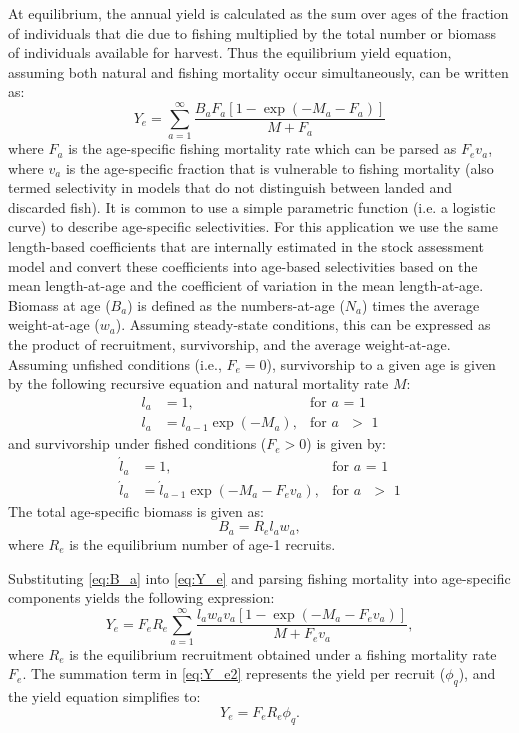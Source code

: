 \documentclass[12pt,leqno]{article}
\begin{document}
At equilibrium, the annual yield is calculated as the sum over ages of the fraction of individuals that die due to fishing multiplied by the total number or biomass of individuals available for harvest.  Thus the equilibrium yield equation, assuming both natural and fishing mortality occur simultaneously,  can be written as:
\begin{equation}\label{eq:Y_e}
	Y_e = \sum_{a=1}^\infty \frac{B_a F_a [1-\exp(-M_a-F_a)]}{M+F_a}
\end{equation}
where $F_a$ is the age-specific fishing mortality rate which can be parsed as $F_e v_a$, where $v_a$ is the age-specific fraction that is vulnerable to fishing mortality (also termed selectivity in models that do not distinguish between landed and discarded fish).  It is common to use a simple parametric function (i.e. a logistic curve) to describe age-specific selectivities.  For this application we use the same length-based coefficients that are internally estimated in the stock assessment model and convert these coefficients into age-based selectivities based on the mean length-at-age and the coefficient of variation in the mean length-at-age.  Biomass at age ($B_a$) is defined as the numbers-at-age ($N_a$) times the average weight-at-age ($w_a$).  Assuming steady-state conditions, this can be expressed as the product of recruitment, survivorship, and the average weight-at-age.  Assuming unfished conditions (i.e., $F_e=0$), survivorship to a given age is given by the following recursive equation and natural mortality rate $M$:
\begin{align}\label{eq:unfished_survivorship}
	l_a &= 1,  &\mbox{for $a$ = 1} \nonumber \\
	l_a &= l_{a-1} \exp(-M_a),& \mbox{for $a$ $>$ 1}
\end{align}
and survivorship under fished conditions ($F_e > 0$) is given by:
\begin{align}\label{eq:fished_survivorship}
	\acute{l}_a &=1, &\mbox{for $a$ = 1} \nonumber\\
	\acute{l}_{a} &= \acute{l}_{a-1} \exp(-M_a-F_e v_a), &\mbox{for $a$ $>$ 1} 
\end{align}
The total age-specific biomass  is given as:
\begin{equation} \label{eq:B_a}
	B_a = R_e l_a w_a,
\end{equation}
where $R_e$ is the equilibrium number of age-1 recruits.

Substituting \eqref{eq:B_a} into  \eqref{eq:Y_e} and parsing fishing mortality into age-specific components yields the following expression:
\begin{equation}\label{eq:Y_e2}
	Y_e = F_e R_e \sum_{a=1}^\infty \frac{l_a w_a v_a [1-\exp(-M_a-F_e v_a)]}{M+F_e v_a},
\end{equation}
where $R_e$ is the equilibrium recruitment obtained under a fishing mortality rate $F_e$. The summation term in \eqref{eq:Y_e2} represents the yield per recruit ($\phi_q$), and the yield equation simplifies to:
\begin{equation}\label{eq:Y_e3}
	Y_e = F_e R_e \phi_q.
\end{equation}
\end{document}
